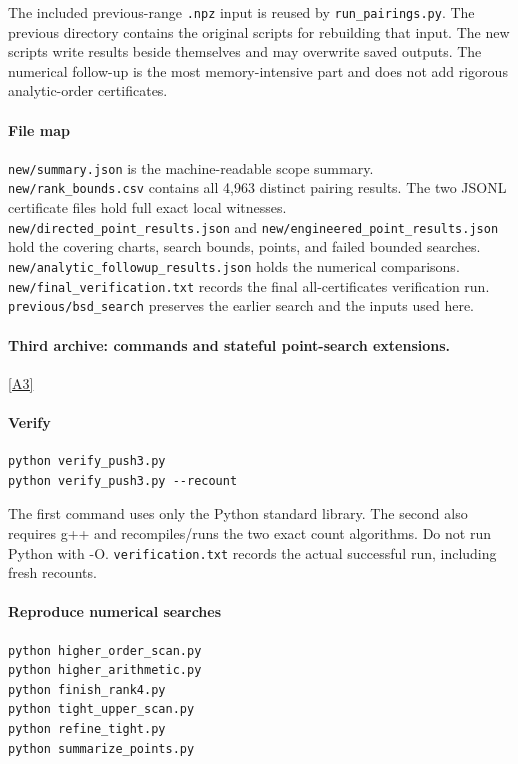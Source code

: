 \documentclass[11pt]{article}
\newcommand{\srcref}[1]{\hyperlink{source:#1}{[#1]}}
\begin{document}
The included previous-range \nolinkurl{.npz} input is reused by \nolinkurl{run_pairings.py}. The previous directory contains the original scripts for rebuilding that input. The new scripts write results beside themselves and may overwrite saved outputs. The numerical follow-up is the most memory-intensive part and does not add rigorous analytic-order certificates.

\paragraph{File map}

\nolinkurl{new/summary.json} is the machine-readable scope summary. \nolinkurl{new/rank_bounds.csv} contains all 4,963 distinct pairing results. The two JSONL certificate files hold full exact local witnesses. \nolinkurl{new/directed_point_results.json} and \nolinkurl{new/engineered_point_results.json} hold the covering charts, search bounds, points, and failed bounded searches. \nolinkurl{new/analytic_followup_results.json} holds the numerical comparisons. \nolinkurl{new/final_verification.txt} records the final all-certificates verification run. \nolinkurl{previous/bsd_search} preserves the earlier search and the inputs used here.
\paragraph{Third archive: commands and stateful point-search extensions.}\srcref{A3}
\paragraph{Verify}

\begin{Verbatim}[breaklines=true,breakanywhere=true,fontsize=\small]
python verify_push3.py
python verify_push3.py --recount
\end{Verbatim}

The first command uses only the Python standard library. The second also requires g++ and recompiles/runs the two exact count algorithms. Do not run Python with -O. \nolinkurl{verification.txt} records the actual successful run, including fresh recounts.

\paragraph{Reproduce numerical searches}

\begin{Verbatim}[breaklines=true,breakanywhere=true,fontsize=\small]
python higher_order_scan.py
python higher_arithmetic.py
python finish_rank4.py
python tight_upper_scan.py
python refine_tight.py
python summarize_points.py
\end{Verbatim}
\end{document}
